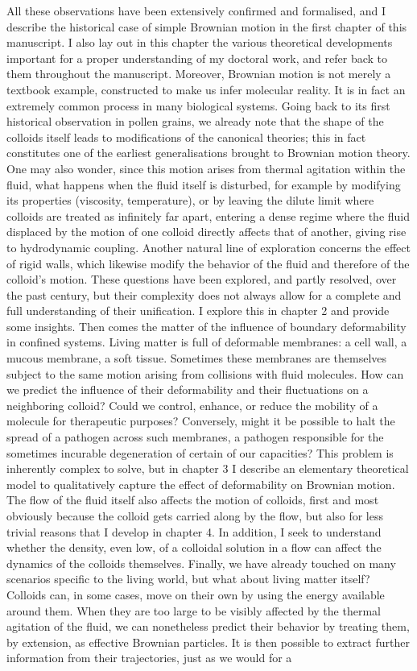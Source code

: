 All these observations have been extensively confirmed and formalised, and I describe the historical case of simple Brownian motion in the first chapter of this manuscript. I also lay out in this chapter the various theoretical developments important for a proper understanding of my doctoral work, and refer back to them throughout the manuscript. Moreover, Brownian motion is not merely a textbook example, constructed to make us infer molecular reality. It is in fact an extremely common process in many biological systems. Going back to its first historical observation in pollen grains, we already note that the shape of the colloids itself leads to modifications of the canonical theories; this in fact constitutes one of the earliest generalisations brought to Brownian motion theory. One may also wonder, since this motion arises from thermal agitation within the fluid, what happens when the fluid itself is disturbed, for example by modifying its properties (viscosity, temperature), or by leaving the dilute limit where colloids are treated as infinitely far apart, entering a dense regime where the fluid displaced by the motion of one colloid directly affects that of another, giving rise to hydrodynamic coupling. Another natural line of exploration concerns the effect of rigid walls, which likewise modify the behavior of the fluid and therefore of the colloid's motion. These questions have been explored, and partly resolved, over the past century, but their complexity does not always allow for a complete and full understanding of their unification. I explore this in chapter 2 and provide some insights. Then comes the matter of the influence of boundary deformability in confined systems. Living matter is full of deformable membranes: a cell wall, a mucous membrane, a soft tissue. Sometimes these membranes are themselves subject to the same motion arising from collisions with fluid molecules. How can we predict the influence of their deformability and their fluctuations on a neighboring colloid? Could we control, enhance, or reduce the mobility of a molecule for therapeutic purposes? Conversely, might it be possible to halt the spread of a pathogen across such membranes, a pathogen responsible for the sometimes incurable degeneration of certain of our capacities? This problem is inherently complex to solve, but in chapter 3 I describe an elementary theoretical model to qualitatively capture the effect of deformability on Brownian motion. The flow of the fluid itself also affects the motion of colloids, first and most obviously because the colloid gets carried along by the flow, but also for less trivial reasons that I develop in chapter 4. In addition, I seek to understand whether the density, even low, of a colloidal solution in a flow can affect the dynamics of the colloids themselves. Finally, we have already touched on many scenarios specific to the living world, but what about living matter itself? Colloids can, in some cases, move on their own by using the energy available around them. When they are too large to be visibly affected by the thermal agitation of the fluid, we can nonetheless predict their behavior by treating them, by extension, as effective Brownian particles. It is then possible to extract further information from their trajectories, just as we would for a 